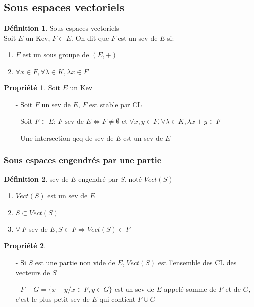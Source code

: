 \documentclass[fleqn]{article}
\theoremstyle{definition} \newtheorem*{defi}{D\'efinition}
\theoremstyle{definition} \newtheorem*{theo}{Th\'eor\`eme}
\theoremstyle{definition} \newtheorem*{coro}{Corollaire}
\theoremstyle{definition} \newtheorem*{nota}{Notation}
\theoremstyle{remark} \newtheorem*{rqs}{Remarques}
\theoremstyle{definition} \newtheorem*{prop}{Propri\'et\'e}
\begin{document}
\subsection{Sous espaces vectoriels}
\begin{defi} Sous espaces vectoriels \\Soit $E$ un Kev, $F \subset E$. On dit que $F$ est un sev de $E$ si:
	\begin{enumerate}
		\item $F$ est un sous groupe de $(E, +)$
		\item $\forall x \in F,\forall \lambda \in K, \lambda x \in F$
	\end{enumerate}
\end{defi}

\begin{prop} Soit $E$ un Kev
	\begin{enumerate}
		\item [-] Soit $F$ un sev de $E$, $F$ est stable par CL
		\item [-] Soit $F \subset E$:
			$F \text{ sev de } E \Leftrightarrow F \neq \emptyset \text{ et } \forall x,y \in F, \forall \lambda \in K, \lambda x + y \in F$
		\item [-] Une intersection qcq de sev de $E$ est un sev de $E$
	\end{enumerate}
\end{prop}

\subsubsection{Sous espaces engendr\'es par une partie}
\begin{defi} sev de $E$ engendr\'e par $S$, not\'e $Vect(S)$
	\begin{enumerate}
		\item $Vect(S)$ est un sev de $E$
		\item $S \subset Vect(S)$
		\item $\forall\ F$ sev de $E, S \subset F \Rightarrow Vect(S) \subset F$
	\end{enumerate}
\end{defi}

\begin{prop} $ $
	\begin{enumerate}
		\item [-] Si $S$ est une partie non vide de $E$, $Vect(S)$ est l'ensemble des CL des vecteurs de $S$
		\item [-] $F+G = \{x+y/ x \in F, y \in G\}$  est un sev de $E$ appel\'e somme de $F$ et de $G$, c'est le plus petit sev de $E$ qui
			contient $F\cup G$
	\end{enumerate}
\end{prop}
\end{document}
